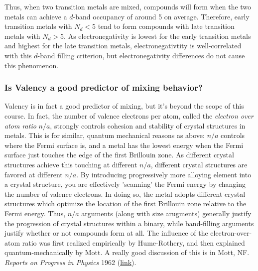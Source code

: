 \documentclass[12pt]{article}
\begin{document}
Thus, when two transition metals are mixed, compounds will form when the two metals can achieve a $d$-band occupancy of around 5 on average. Therefore, early transition metals with $N_d<5$ tend to form compounds with late transition metals with $N_d>5$. As electronegativity is lowest for the early transition metals and highest for the late transition metals, electronegativtity is well-correlated with this $d$-band filling criterion, but electronegativity differences do not cause this phenomenon.

\subsubsection{Is Valency a good predictor of mixing behavior?}
Valency is in fact a good predictor of mixing, but it's beyond the scope of this course. In fact, the number of valence electrons per atom, called the \emph{electron over atom ratio} $n/a$, strongly controls cohesion and stability of crystal structures in metals. This is for similar, quantum mechanical reasons as above: $n/a$ controls where the Fermi surface is, and a metal has the lowest energy when the Fermi surface just touches the edge of the first Brillouin zone. As different crystal structures achieve this touching at different $n/a$, different crystal structures are favored at different $n/a$. By introducing progressively more alloying element into a crystal structure, you are effectively 'scanning' the Fermi energy by changing the number of valence electrons. In doing so, the metal adopts different crystal structures which optimize the location of the first Brillouin zone relative to the Fermi energy. Thus, $n/a$ arguments (along with size arugments) generally justify the progression of crystal structures within a binary, while band-filling arguments justify whether or not compounds form at all. The influence of the electron-over-atom ratio was first realized empirically by Hume-Rothery, and then explained quantum-mechanically by Mott. A really good discussion of this is in Mott, NF. \textit{Reports on Progress in Physics} 1962 (\href{http://dx.doi.org/10.1088/0034-4885/25/1/306}{link}).
\end{document}

